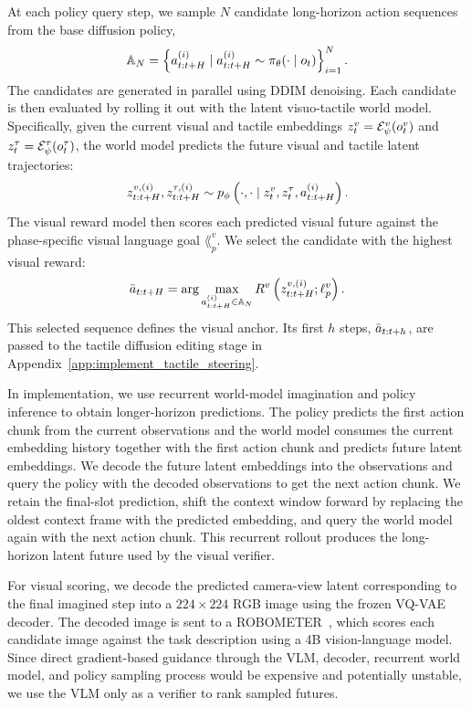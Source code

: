 At each policy query step, we sample $N$ candidate long-horizon action sequences from the base diffusion policy,
\begin{equation}
\mathbb{A}_N
=
\left\{
a_{t:t+H}^{(i)}
\mid
a_{t:t+H}^{(i)}
\sim
\pi_\theta(\cdot \mid o_t)
\right\}_{i=1}^{N}.
\label{eq:visual_candidate_set}
\end{equation}
The candidates are generated in parallel using DDIM denoising. Each candidate is then evaluated by rolling it out with the latent visuo-tactile world model. Specifically, given the current visual and tactile embeddings
$z^{v}_t=\mathcal{E}_\psi^{v}(o^v_t)$ and $z^{\tau}_t=\mathcal{E}_\psi^{\tau}(o^\tau_t)$, the world model predicts the future visual and tactile latent trajectories:
\begin{equation}
z_{t:t+H}^{v,(i)}, z_{t:t+H}^{\tau,(i)}
\sim
p_\phi
\left(
    \cdot,\cdot
    \mid
    z^{v}_t,
    z^{\tau}_t,
    a_{t:t+H}^{(i)}
\right).
\label{eq:visual_wm_rollout}
\end{equation}
The visual reward model then scores each predicted visual future against the phase-specific visual language goal $\lang_p^v$. We select the candidate with the highest visual reward:
\begin{equation}
\bar{a}_{t:t+H}
=
\arg\max_{a_{t:t+H}^{(i)} \in \mathbb{A}_N}
R^v
\left(
    z_{t:t+H}^{v,(i)};
    \ell_p^v
\right).
\label{eq:visual_candidate_selection}
\end{equation}
This selected sequence defines the visual anchor. Its first $h$ steps,
$\bar{a}_{t:t+h}$, are passed to the tactile diffusion editing stage in
Appendix~\ref{app:implement_tactile_steering}.

In implementation, we use recurrent world-model imagination and policy inference to obtain longer-horizon predictions. The policy predicts the first action chunk from the current observations and the world model consumes the current embedding history together with the first action chunk and predicts future latent embeddings. We decode the future latent embeddings into the observations and query the policy with the decoded observations to get the next action chunk. We retain the final-slot prediction, shift the context window forward by replacing the oldest context frame with the predicted embedding, and query the world model again with the next action chunk. This recurrent rollout produces the long-horizon latent future used by the visual verifier.

For visual scoring, we decode the predicted camera-view latent corresponding to the final imagined step into a $224 \times 224$ RGB image using the frozen VQ-VAE decoder. The decoded image is sent to a ROBOMETER~\cite{liang2026robometer}, which scores each candidate image against the task description using a 4B vision-language model. Since direct gradient-based guidance through the VLM, decoder, recurrent world model, and policy sampling process would be expensive and potentially unstable, we use the VLM only as a verifier to rank sampled futures.

